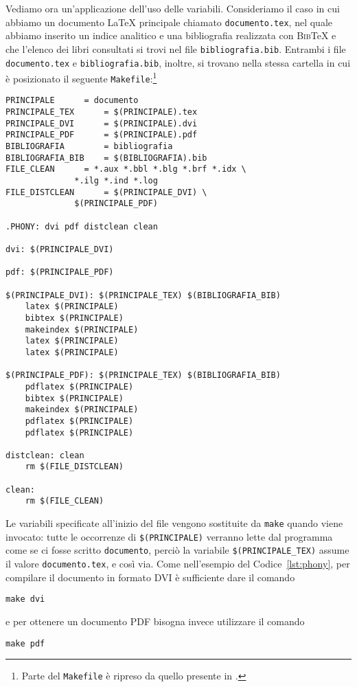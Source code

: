 Vediamo ora un'applicazione dell'uso delle variabili.  Consideriamo il caso in
cui abbiamo un documento \LaTeX{}
principale chiamato \verb|documento.tex|, nel quale abbiamo inserito un indice
analitico e una bibliografia realizzata con \textsc{Bib}\TeX{}
e che l'elenco dei libri consultati si trovi nel file \verb|bibliografia.bib|.
Entrambi i file \verb|documento.tex| e \verb|bibliografia.bib|, inoltre, si
trovano nella stessa cartella in cui è posizionato il seguente
\verb|Makefile|:\footnote{Parte del \texttt{Makefile} è ripreso da quello
  presente in \textcite[61]{caucci:tabelle}.}
\begin{lstlisting}[caption={Esempio di \texttt{Makefile} che utilizza le
variabili},label=lst:variabili]
PRINCIPALE 		= documento
PRINCIPALE_TEX		= $(PRINCIPALE).tex
PRINCIPALE_DVI		= $(PRINCIPALE).dvi
PRINCIPALE_PDF		= $(PRINCIPALE).pdf
BIBLIOGRAFIA		= bibliografia
BIBLIOGRAFIA_BIB	= $(BIBLIOGRAFIA).bib
FILE_CLEAN		= *.aux *.bbl *.blg *.brf *.idx \
			  *.ilg *.ind *.log
FILE_DISTCLEAN		= $(PRINCIPALE_DVI) \
			  $(PRINCIPALE_PDF)

.PHONY: dvi pdf distclean clean

dvi: $(PRINCIPALE_DVI)

pdf: $(PRINCIPALE_PDF)

$(PRINCIPALE_DVI): $(PRINCIPALE_TEX) $(BIBLIOGRAFIA_BIB)
	latex $(PRINCIPALE)
	bibtex $(PRINCIPALE)
	makeindex $(PRINCIPALE)
	latex $(PRINCIPALE)
	latex $(PRINCIPALE)

$(PRINCIPALE_PDF): $(PRINCIPALE_TEX) $(BIBLIOGRAFIA_BIB)
	pdflatex $(PRINCIPALE)
	bibtex $(PRINCIPALE)
	makeindex $(PRINCIPALE)
	pdflatex $(PRINCIPALE)
	pdflatex $(PRINCIPALE)

distclean: clean
	rm $(FILE_DISTCLEAN)

clean:
	rm $(FILE_CLEAN)
\end{lstlisting}
Le variabili specificate all'inizio del file vengono sostituite da \verb|make|
quando viene invocato: tutte le occorrenze di
\verb|$(PRINCIPALE)| verranno lette dal programma come se ci fosse scritto
\verb|documento|, perciò la variabile \verb|$(PRINCIPALE_TEX)|
assume il valore \verb|documento.tex|, e così via. Come nell'esempio del
Codice~\ref{lst:phony}, per compilare il documento in formato \textsc{DVI} è
sufficiente dare il comando
\begin{verbatim}
make dvi
\end{verbatim}
e per ottenere un documento \textsc{PDF} bisogna invece utilizzare il comando
\begin{verbatim}
make pdf
\end{verbatim}

